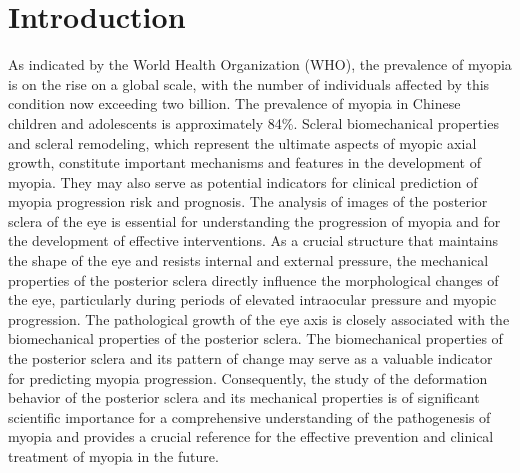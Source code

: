 \documentclass[AMA,Times1COL]{WileyNJDv5} %
\providecommand{\DIFaddbegin}{} %
\providecommand{\DIFaddend}{} %
\providecommand{\DIFdelbegin}{} %
\providecommand{\DIFdelend}{} %
\begin{document}
\DIFdelbegin %
\DIFdelend \DIFaddbegin {} 
\DIFaddend 

\maketitle

\section{Introduction}
As indicated by the World Health Organization (WHO), the prevalence of myopia is on the rise on a global scale, with the number of individuals affected by this condition now exceeding two billion. The prevalence of myopia in Chinese children and adolescents is approximately 84\%\cite{dong2020prevalence}. Scleral biomechanical properties and scleral remodeling, which represent the ultimate aspects of myopic axial growth, constitute important mechanisms and features in the development of myopia. They may also serve as potential indicators for clinical prediction of myopia progression risk and prognosis\cite{Cao2023}. The analysis of images of the posterior sclera of the eye is essential for understanding the progression of myopia and for the development of effective interventions. As a crucial structure that maintains the shape of the eye and resists internal and external pressure, the mechanical properties of the posterior sclera directly influence the morphological changes of the eye, particularly during periods of elevated intraocular pressure and myopic progression. The pathological growth of the eye axis is closely associated with the biomechanical properties of the posterior sclera. The biomechanical properties of the posterior sclera and its pattern of change may serve as a valuable indicator for predicting myopia progression\cite{Ding2015}. Consequently, the study of the deformation behavior of the posterior sclera and its mechanical properties is of significant scientific importance for a comprehensive understanding of the pathogenesis of myopia and provides a crucial reference for the effective prevention and clinical treatment of myopia in the future.
\end{document}
